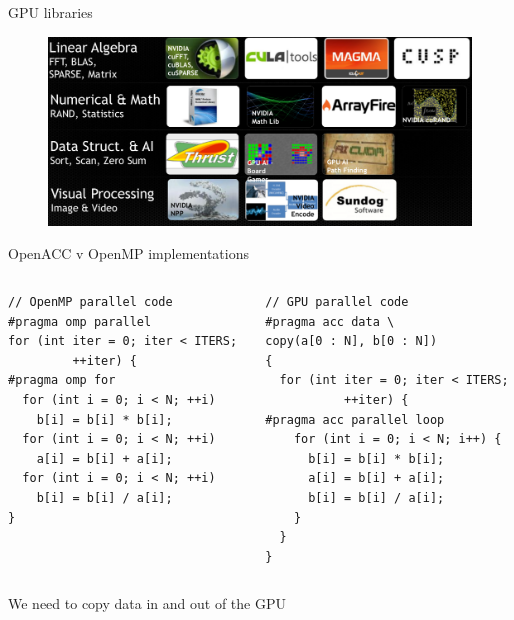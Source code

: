 \documentclass[10pt,times]{beamer}
\begin{document}
\begin{frame}{GPU libraries}

\begin{figure}
\includegraphics[width=\linewidth]{figs/GPU_libraries}
\end{figure}

\end{frame}


\begin{frame}[fragile]{OpenACC v OpenMP implementations}
\begin{columns}
\begin{verbatim}
// OpenMP parallel code
#pragma omp parallel
for (int iter = 0; iter < ITERS; 
         ++iter) {
#pragma omp for         
  for (int i = 0; i < N; ++i)
    b[i] = b[i] * b[i];
  for (int i = 0; i < N; ++i)
    a[i] = b[i] + a[i];
  for (int i = 0; i < N; ++i)
    b[i] = b[i] / a[i];
}

\end{verbatim}
\begin{verbatim}
// GPU parallel code
#pragma acc data \
copy(a[0 : N], b[0 : N])
{
  for (int iter = 0; iter < ITERS;
           ++iter) {
#pragma acc parallel loop
    for (int i = 0; i < N; i++) {
      b[i] = b[i] * b[i];
      a[i] = b[i] + a[i];
      b[i] = b[i] / a[i];
    }
  }
}
\end{verbatim}
\end{columns}

We need to copy data in and out of the GPU
\end{frame}
\end{document}

